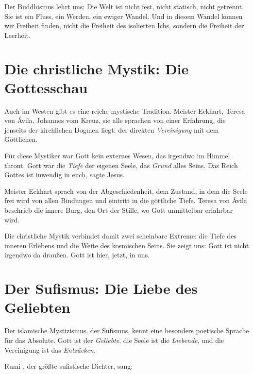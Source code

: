 Der Buddhismus lehrt uns: Die Welt ist nicht fest, nicht statisch, nicht getrennt. Sie ist ein Fluss, ein Werden, ein ewiger Wandel. Und in diesem Wandel können wir Freiheit finden, nicht die Freiheit des isolierten Ichs, sondern die Freiheit der Leerheit.

\section{Die christliche Mystik: Die Gottesschau}

Auch im Westen gibt es eine reiche mystische Tradition. Meister Eckhart, Teresa von Ávila, Johannes vom Kreuz, sie alle sprachen von einer Erfahrung, die jenseits der kirchlichen Dogmen liegt: der direkten \emph{Vereinigung} mit dem Göttlichen.

Für diese Mystiker war Gott kein externes Wesen, das irgendwo im Himmel thront. Gott war die \emph{Tiefe} der eigenen Seele, das \emph{Grund} alles Seins. \glqq Das Reich Gottes ist inwendig in euch\grqq{}, sagte Jesus.

Meister Eckhart sprach von der \glqq Abgeschiedenheit\grqq{}, dem Zustand, in dem die Seele frei wird von allen Bindungen und eintritt in die göttliche Tiefe. Teresa von Ávila beschrieb die \glqq innere Burg\grqq{}, den Ort der Stille, wo Gott unmittelbar erfahrbar wird.

Die christliche Mystik verbindet damit zwei scheinbare Extreme: die Tiefe des inneren Erlebens und die Weite des kosmischen Seins. Sie zeigt uns: Gott ist nicht irgendwo da draußen. Gott ist hier, jetzt, in uns.

\section{Der Sufismus: Die Liebe des Geliebten}

Der islamische Mystizismus, der Sufismus, kennt eine besonders poetische Sprache für das Absolute. Gott ist der \emph{Geliebte}, die Seele ist die \emph{Liebende}, und die Vereinigung ist das \emph{Entzücken}.

Rumi \cite{Rumi1995}, der größte sufistische Dichter, sang:

